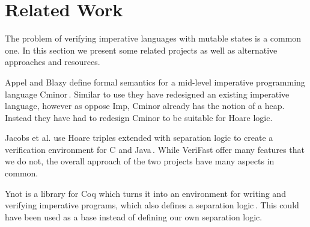 \section{Related Work}
\label{sec:related_work}
The problem of verifying imperative languages with mutable states is a common one. In this section we present some related projects as well as alternative approaches and resources.

Appel and Blazy define formal semantics for a mid-level imperative programming language Cminor\,\cite{Appel07separationlogic}. Similar to use they have redesigned an existing imperative language, however as oppose Imp, Cminor already has the notion of a heap. Instead they have had to redesign Cminor to be suitable for Hoare logic.

Jacobs et al. use Hoare triples extended with separation logic to create a verification environment for C and Java\,\cite{Jacobs:2010:QTV:1947873.1947902}. While VeriFast offer many features that we do not, the overall approach of the two projects have many aspects in common.

Ynot is a library for Coq which turns it into an environment for writing and verifying imperative programs, which also defines a separation logic\,\cite{Ynot}. This could have been used as a base instead of defining our own separation logic.
